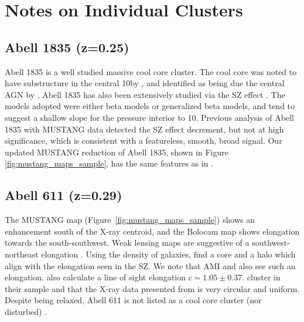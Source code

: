 \documentclass[iop,numberedappendix,apj]{emulateapj}
\begin{document}
\section{Notes on Individual Clusters}
\label{sec:ind_notes}


\subsection{Abell 1835 (z=0.25)}
\label{sec:results_a1835}


Abell 1835 is a well studied massive cool core cluster. The cool core was noted to have substructure in the central
10\asecs by \citet{schmidt2001}, and identified as being due the central AGN by \citet{mcnamara2006}. Abell 1835 has also
been extensively studied via the SZ effect \citep{reese2002,benson2004,bonamente2006,sayers2011,mauskopf2012}. The models adopted
were either beta models or generalized beta models, and tend to suggest a shallow slope for the pressure interior
to 10\asec. Previous analysis of Abell 1835 with MUSTANG data \citep{korngut2011} detected the SZ effect decrement, but not
at high significance, which is consistent with a featureless, smooth, broad signal. Our updated MUSTANG reduction
of Abell 1835, shown in Figure \ref{fig:mustang_maps_sample}, has the same features as in \citet{korngut2011}.


\subsection{Abell 611 (z=0.29)}
\label{sec:results_a611}


The MUSTANG map (Figure~\ref{fig:mustang_maps_sample}) shows an enhancement
south of the X-ray centroid, and the Bolocam map shows elongation towards the south-southwest. Weak lensing maps
are suggestive of a southwest-northeast elongation \citep{newman2009, zitrin2015}.
Using the density of galaxies, \citet{lemze2013} find a core and a halo which align with the elongation seen 
in the SZ. We note that AMI \citep{hurley-walker2012} and \citet{defilippis2005} also see such an elongation. 
\citet{defilippis2005} also calculate a line of sight elongation $c = 1.05 \pm 0.37$.
cluster in their sample and that the X-ray data presented from \citet{laroque2006} is very circular and uniform.
Despite being relaxed, Abell 611 is not listed as a cool core cluster (nor disturbed) \citep{sayers2013}.
\end{document}
